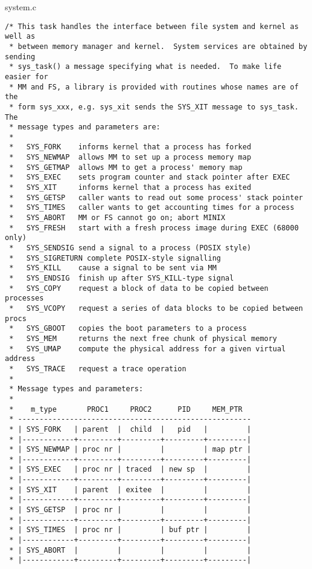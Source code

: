 system.c

\begin{verbatim}
/* This task handles the interface between file system and kernel as well as
 * between memory manager and kernel.  System services are obtained by sending
 * sys_task() a message specifying what is needed.  To make life easier for
 * MM and FS, a library is provided with routines whose names are of the
 * form sys_xxx, e.g. sys_xit sends the SYS_XIT message to sys_task.  The
 * message types and parameters are:
 *
 *   SYS_FORK	 informs kernel that a process has forked
 *   SYS_NEWMAP	 allows MM to set up a process memory map
 *   SYS_GETMAP	 allows MM to get a process' memory map
 *   SYS_EXEC	 sets program counter and stack pointer after EXEC
 *   SYS_XIT	 informs kernel that a process has exited
 *   SYS_GETSP	 caller wants to read out some process' stack pointer
 *   SYS_TIMES	 caller wants to get accounting times for a process
 *   SYS_ABORT	 MM or FS cannot go on; abort MINIX
 *   SYS_FRESH	 start with a fresh process image during EXEC (68000 only)
 *   SYS_SENDSIG send a signal to a process (POSIX style)
 *   SYS_SIGRETURN complete POSIX-style signalling
 *   SYS_KILL	 cause a signal to be sent via MM
 *   SYS_ENDSIG	 finish up after SYS_KILL-type signal
 *   SYS_COPY	 request a block of data to be copied between processes
 *   SYS_VCOPY   request a series of data blocks to be copied between procs
 *   SYS_GBOOT	 copies the boot parameters to a process
 *   SYS_MEM	 returns the next free chunk of physical memory
 *   SYS_UMAP	 compute the physical address for a given virtual address
 *   SYS_TRACE	 request a trace operation
 *
 * Message types and parameters:
 *
 *    m_type       PROC1     PROC2      PID     MEM_PTR
 * ------------------------------------------------------
 * | SYS_FORK   | parent  |  child  |   pid   |         |
 * |------------+---------+---------+---------+---------|
 * | SYS_NEWMAP | proc nr |         |         | map ptr |
 * |------------+---------+---------+---------+---------|
 * | SYS_EXEC   | proc nr | traced  | new sp  |         |
 * |------------+---------+---------+---------+---------|
 * | SYS_XIT    | parent  | exitee  |         |         |
 * |------------+---------+---------+---------+---------|
 * | SYS_GETSP  | proc nr |         |         |         |
 * |------------+---------+---------+---------+---------|
 * | SYS_TIMES  | proc nr |         | buf ptr |         |
 * |------------+---------+---------+---------+---------|
 * | SYS_ABORT  |         |         |         |         |
 * |------------+---------+---------+---------+---------|

\end{verbatim}
